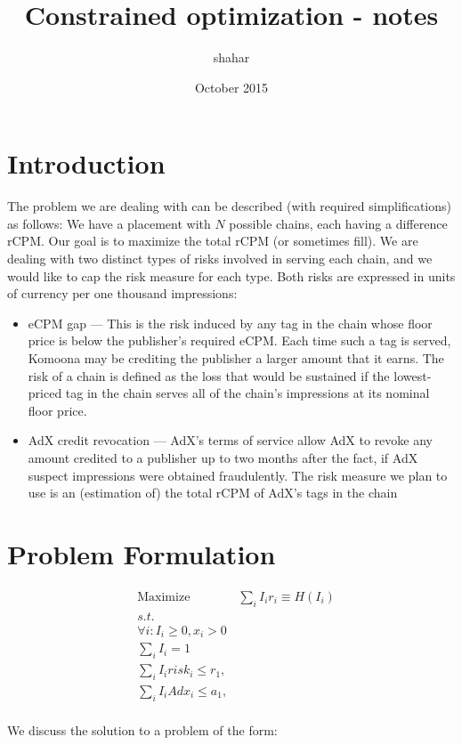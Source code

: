 \documentclass{article}
\title{Constrained optimization - notes}
\author{shahar }
\date{October 2015}
\begin{document}
\raggedright
\begin{large}

\maketitle

\section{Introduction}
The problem we are dealing with can be described (with required simplifications) as follows: We have a placement with $N$ possible chains, each having a difference rCPM. Our goal is to maximize the total rCPM (or sometimes fill). We are dealing with two distinct types of risks involved in serving each chain, and we would like to cap the risk measure for each type. Both risks are expressed in units of currency per one thousand impressions:
\begin{itemize}
\item eCPM gap --- This is the risk induced by any tag in the chain whose floor price is below the publisher's required eCPM. Each time such a tag is served, Komoona may be crediting the publisher a larger amount that it earns. The risk of a chain is defined as the loss that would be sustained if the lowest-priced tag in the chain serves all of the chain's impressions at its nominal floor price.

\item AdX credit revocation ---
AdX's terms of service allow AdX to revoke any amount credited to a publisher up to two months after the fact, if AdX suspect impressions were obtained fraudulently.
The risk measure we plan to use is an (estimation of) the total rCPM of AdX's tags in the chain
\end{itemize}

\section{Problem Formulation}
\begin{equation}
\begin{aligned}
&\text{Maximize} &\sum_{i}{I_i r_i} \equiv H(I_i)\\
&s.t. \\ 
&\forall i: I_i \geq 0 , x_i > 0\\
&\sum_{i}{I_i}=1\\
&\sum_{i}{I_i risk_i} \leq r_1,\\ 
&\sum_{i}{I_i Adx_i} \leq a_1,\\ 
\end{aligned} 
\end{equation}

We discuss the solution to a problem of the form:

\end{large}
\end{document}
